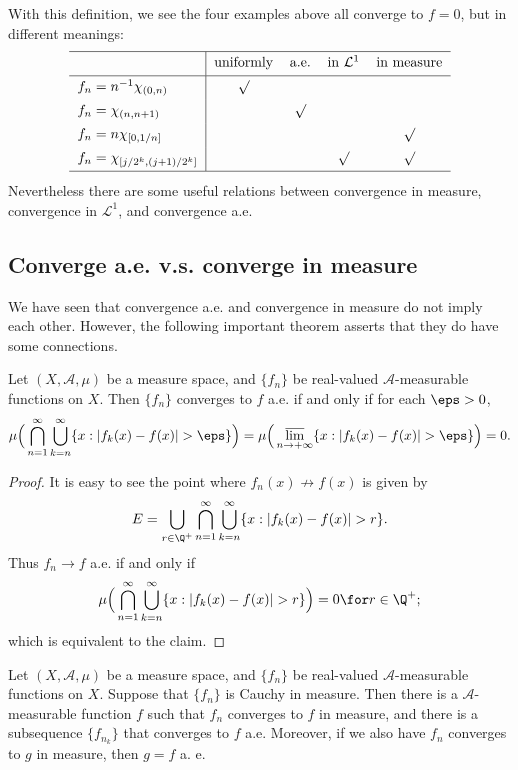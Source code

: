 With this definition, we see the four examples above all converge to $f=0$, but in different meanings:
\[
\renewcommand\arraystretch{1.25}
\begin{tabular}{l|cccc}
\hline
&\text{uniformly}&\text{a.e.}&\text{in $\mathcal{L}^1$}&\text{in measure}\\[2pt]
\hline
$f_n=n^{-1}\chi_{(0,n)}$&$\surd$&\\[2pt]
$f_n=\chi_{(n,n+1)}$&&$\surd$\\[2pt]
$f_n=n\chi_{[0,1/n]}$&&&&$\surd$\\[2pt]
$f_n=\chi_{[j/2^k,(j+1)/2^k]}$&&&$\surd$&$\surd$\\[2pt]
\hline
\end{tabular}\]
Nevertheless there are some useful relations between convergence in measure, convergence in $\mathcal{L}^1$, and convergence a.e.
\subsection{Converge a.e. v.s. converge in measure}
We have seen that convergence a.e. and convergence in measure do not imply each other. However, the following important theorem asserts that they do have some connections.
\begin{lemma}\label{converge a.e. iff}
Let $(X,\mathcal{A},\mu)$ be a measure space, and $\{f_n\}$ be real-valued $\mathcal{A}$-measurable functions on $X$. Then $\{f_n\}$ converges to $f$ a.e. if and only if for each $\eps>0$,
\[\mu\Big(\bigcap_{n=1}^{\infty}\bigcup_{k=n}^{\infty}\{x:|f_k(x)-f(x)|>\eps\}\Big)=\mu\Big(\varlimsup_{n\to+\infty}\{x:|f_k(x)-f(x)|>\eps\}\Big)=0.\]
\end{lemma}
\begin{proof}
It is easy to see the point where $f_n(x)\not\to f(x)$ is given by
\[E=\bigcup_{r\in\Q^+}\bigcap_{n=1}^{\infty}\bigcup_{k=n}^{\infty}\{x:|f_k(x)-f(x)|>r\}.\]
Thus $f_n\to f$ a.e. if and only if
\[\mu\Big(\bigcap_{n=1}^{\infty}\bigcup_{k=n}^{\infty}\{x:|f_k(x)-f(x)|>r\}\Big)=0\for r\in\Q^+;\]
which is equivalent to the claim.
\end{proof}
\begin{theorem}\label{convergence in measure subsequence converge a.e.}
Let $(X,\mathcal{A},\mu)$ be a measure space, and $\{f_n\}$ be real-valued $\mathcal{A}$-measurable functions on $X$. Suppose that $\{f_n\}$ is Cauchy in measure. Then there is a $\mathcal{A}$-measurable function $f$ such that $f_n$ converges to $f$ in measure, and there is a subsequence $\{f_{n_k}\}$ that converges to $f$ a.e. Moreover, if we also have $f_n$ converges to $g$ in measure, then $g=f$ a. e.
\end{theorem}
